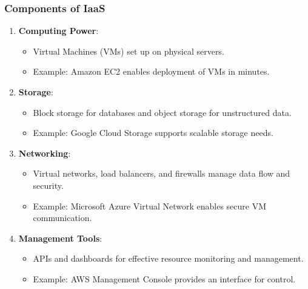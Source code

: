 \documentclass[aspectratio=169]{beamer}
\begin{document}
\begin{frame}[fragile]
    \frametitle{Components of IaaS}
    \begin{enumerate}
        \item \textbf{Computing Power}:
            \begin{itemize}
                \item Virtual Machines (VMs) set up on physical servers.
                \item Example: Amazon EC2 enables deployment of VMs in minutes.
            \end{itemize}
        \item \textbf{Storage}:
            \begin{itemize}
                \item Block storage for databases and object storage for unstructured data.
                \item Example: Google Cloud Storage supports scalable storage needs.
            \end{itemize}
        \item \textbf{Networking}:
            \begin{itemize}
                \item Virtual networks, load balancers, and firewalls manage data flow and security.
                \item Example: Microsoft Azure Virtual Network enables secure VM communication.
            \end{itemize}
        \item \textbf{Management Tools}:
            \begin{itemize}
                \item APIs and dashboards for effective resource monitoring and management.
                \item Example: AWS Management Console provides an interface for control.
            \end{itemize}
    \end{enumerate}
\end{frame}
\end{document}
